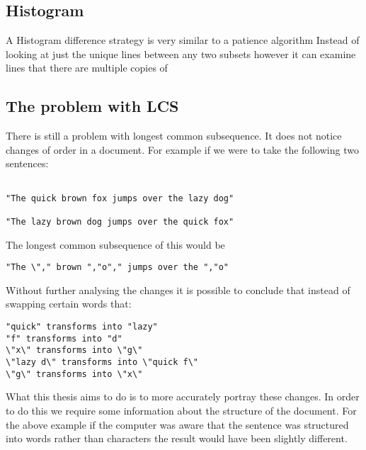 \subsection{Histogram}
A Histogram difference strategy is very similar to a patience algorithm
Instead of looking at just the unique lines between any two subsets however it can examine lines that there are multiple copies of 

\subsection{The problem with LCS}
There is still a problem with longest common subsequence. It does not notice changes of order in a document.  For example if we were to take the following two sentences:


\begin{verbatim}

"The quick brown fox jumps over the lazy dog"

"The lazy brown dog jumps over the quick fox"

\end{verbatim}

The longest common subsequence of this would be

\begin{verbatim}
"The \"," brown ","o"," jumps over the ","o"
\end{verbatim}

Without further analysing the changes it is possible to conclude that instead of swapping certain words that:

\begin{verbatim}
"quick" transforms into "lazy"
"f" transforms into "d"
\"x\" transforms into \"g\"
\"lazy d\" transforms into \"quick f\"
\"g\" transforms into \"x\"
\end{verbatim}

What this thesis aims to do is to more accurately portray these changes.
In order to do this we require some information about the structure of the document.
For the above example if the computer was aware that the sentence was structured into words rather than characters the result would have been slightly different.

